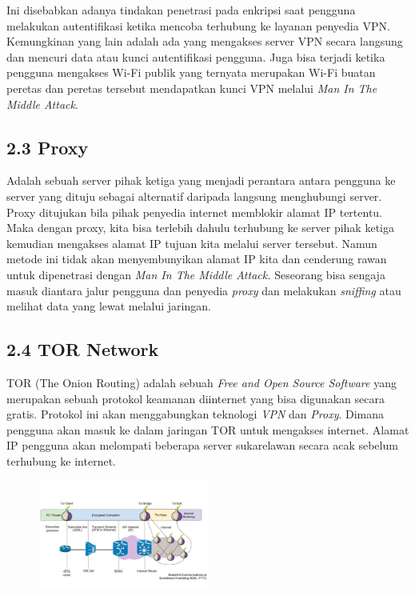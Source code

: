 \documentclass{article}
\begin{document}
        Ini disebabkan adanya tindakan penetrasi pada enkripsi saat pengguna
        melakukan autentifikasi ketika mencoba terhubung ke layanan penyedia VPN.
        Kemungkinan yang lain adalah ada yang mengakses server VPN secara langsung
        dan mencuri data atau kunci autentifikasi pengguna. Juga bisa terjadi ketika
        pengguna mengakses Wi-Fi publik yang ternyata merupakan Wi-Fi buatan peretas 
        dan peretas tersebut mendapatkan kunci VPN melalui \textit{Man In The Middle Attack}.
        \subsection*{2.3 Proxy}
        \noindent Adalah sebuah server pihak ketiga yang menjadi perantara antara
        pengguna ke server yang dituju sebagai alternatif daripada 
        langsung menghubungi server. Proxy ditujukan bila pihak penyedia
        internet memblokir alamat IP tertentu. Maka dengan proxy, kita bisa
        terlebih dahulu terhubung ke server pihak ketiga kemudian mengakses 
        alamat IP tujuan kita melalui server tersebut. Namun metode ini 
        tidak akan menyembunyikan alamat IP kita dan cenderung rawan untuk 
        dipenetrasi dengan \textit{Man In The Middle Attack.} Seseorang bisa sengaja
        masuk diantara jalur pengguna dan penyedia \textit{proxy} dan 
        melakukan \textit{sniffing} atau melihat data yang lewat melalui 
        jaringan.

        \subsection*{2.4 TOR Network}
        TOR (The Onion Routing) adalah sebuah \textit{Free and Open Source Software} yang merupakan sebuah 
        protokol keamanan diinternet yang bisa digunakan secara gratis. Protokol ini akan
        menggabungkan teknologi \textit{VPN} dan \textit{Proxy}. Dimana pengguna akan masuk
        ke dalam jaringan TOR untuk mengakses internet. Alamat IP pengguna akan melompati 
        beberapa server sukarelawan secara acak sebelum terhubung ke internet.
        \begin{figure}[h]
        \includegraphics[scale=0.5, width=0.5\textwidth]{tor.jpg}
        \centering 
        \end{figure}
\end{document}
